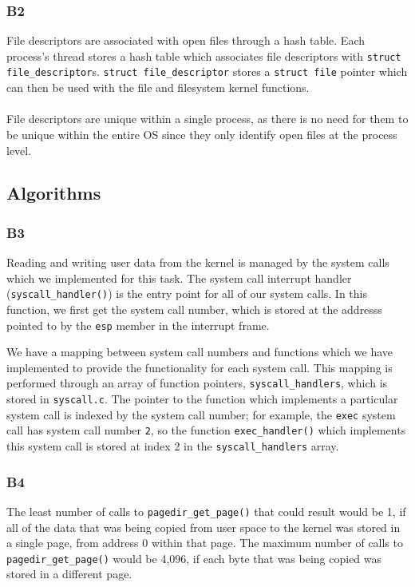 \documentclass[a4wide, 11pt]{article}
\newcommand{\tx}{\texttt}
\begin{document}
\subsubsection{B2}

File descriptors are associated with open files through a hash table. Each process's thread stores a hash table which associates file descriptors with \tx{struct file\_descriptor}s. \tx{struct file\_descriptor} stores a \tx{struct file} pointer which can then be used with the file and filesystem kernel functions.
\\\\
File descriptors are unique within a single process, as there is no need for them to be unique within the entire OS since they only identify open files at the process level.

\subsection{Algorithms}
\subsubsection{B3}

Reading and writing user data from the kernel is managed by the system calls which we implemented for this task. The system call interrupt handler (\tx{syscall\_handler()}) is the entry point for all of our system calls. In this function, we first get the system call number, which is stored at the addresss pointed to by the \tx{esp} member in the interrupt frame.

We have a mapping between system call numbers and functions which we have implemented to provide the functionality for each system call. This mapping is performed through an array of function pointers, \tx{syscall\_handlers}, which is stored in \tx{syscall.c}. The pointer to the function which implements a particular system call is indexed by the system call number; for example, the \tx{exec} system call has system call number \tx{2}, so the function \tx{exec\_handler()} which implements this system call is stored at index 2 in the \tx{syscall\_handlers} array.

\subsubsection{B4}

The least number of calls to \tx{pagedir\_get\_page()} that could result would be 1, if all of the data that was being copied from user space to the kernel was stored in a single page, from address 0 within that page. The maximum number of calls to \tx{pagedir\_get\_page()} would be 4,096, if each byte that was being copied was stored in a different page.
\end{document}
